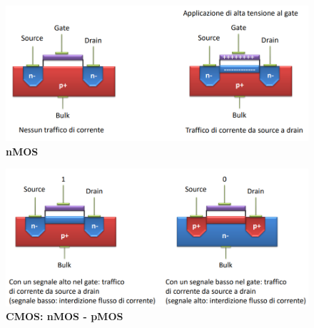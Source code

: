 \documentclass[12pt]{article} %
\begin{document}
\newpage
\begin{figure}[h]
    \centering
    \includegraphics[width=1\linewidth]{NMOS.png}
    \caption{\textbf{nMOS}}
\end{figure}

\begin{figure}[h]
    \centering
    \includegraphics[width=1\linewidth]{cMos.png}
    \caption{\textbf{CMOS: nMOS - pMOS}}
\end{figure}

\newpage
\end{document}
